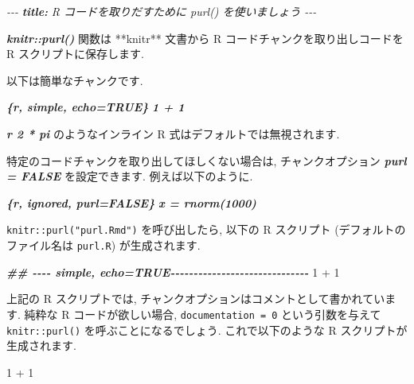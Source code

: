 \documentclass[
  11pt,
]{bxjsreport}
\newenvironment{Shaded}{\begin{snugshade}}{\end{snugshade}}
\newcommand{\AnnotationTok}[1]{\textcolor[rgb]{0.56,0.35,0.01}{\textbf{\textit{#1}}}}
\newcommand{\CommentTok}[1]{\textcolor[rgb]{0.56,0.35,0.01}{\textit{#1}}}
\newcommand{\DecValTok}[1]{\textcolor[rgb]{0.00,0.00,0.81}{#1}}
\newcommand{\DocumentationTok}[1]{\textcolor[rgb]{0.56,0.35,0.01}{\textbf{\textit{#1}}}}
\newcommand{\InformationTok}[1]{\textcolor[rgb]{0.56,0.35,0.01}{\textbf{\textit{#1}}}}
\newcommand{\NormalTok}[1]{#1}
\newcommand{\SpecialCharTok}[1]{\textcolor[rgb]{0.00,0.00,0.00}{#1}}
\begin{document}
\begin{Shaded}
\begin{Highlighting}[]
\CommentTok{{-}{-}{-}}
\AnnotationTok{title:}\CommentTok{ R コードを取りだすために \textasciigrave{}purl()\textasciigrave{} を使いましょう}
\CommentTok{{-}{-}{-}}

\InformationTok{\textasciigrave{}knitr::purl()\textasciigrave{}}\NormalTok{ 関数は **knitr** 文書から  R コードチャンクを取り出しコードを R スクリプトに保存します.}

\NormalTok{以下は簡単なチャンクです.}

\InformationTok{\textasciigrave{}\textasciigrave{}\textasciigrave{}\{r, simple, echo=TRUE\}}
\InformationTok{1 + 1}
\InformationTok{\textasciigrave{}\textasciigrave{}\textasciigrave{}}

\InformationTok{\textasciigrave{}r 2 * pi\textasciigrave{}}\NormalTok{ のようなインライン R 式はデフォルトでは無視されます.}

\NormalTok{特定のコードチャンクを取り出してほしくない場合は, チャンクオプション }\InformationTok{\textasciigrave{}purl = FALSE\textasciigrave{}}\NormalTok{ を設定できます. 例えば以下のように.}

\InformationTok{\textasciigrave{}\textasciigrave{}\textasciigrave{}\{r, ignored, purl=FALSE\}}
\InformationTok{x = rnorm(1000)}
\InformationTok{\textasciigrave{}\textasciigrave{}\textasciigrave{}}
\end{Highlighting}
\end{Shaded}

\texttt{knitr::purl("purl.Rmd")} を呼び出したら, 以下の R スクリプト (デフォルトのファイル名は \texttt{purl.R}) が生成されます.

\begin{Shaded}
\begin{Highlighting}[]
\DocumentationTok{\#\# {-}{-}{-}{-} simple, echo=TRUE{-}{-}{-}{-}{-}{-}{-}{-}{-}{-}{-}{-}{-}{-}{-}{-}{-}{-}{-}{-}{-}{-}{-}{-}{-}{-}{-}{-}{-}{-}}
\DecValTok{1} \SpecialCharTok{+} \DecValTok{1}
\end{Highlighting}
\end{Shaded}

上記の R スクリプトでは, チャンクオプションはコメントとして書かれています. 純粋な R コードが欲しい場合, \texttt{documentation = 0} という引数を与えて \texttt{knitr::purl()} を呼ぶことになるでしょう. これで以下のような R スクリプトが生成されます.

\begin{Shaded}
\begin{Highlighting}[]
\DecValTok{1} \SpecialCharTok{+} \DecValTok{1}
\end{Highlighting}
\end{Shaded}
\end{document}
